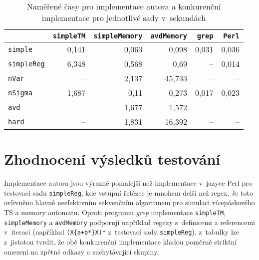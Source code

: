\documentclass[thesis=B,czech]{FITthesis}[2019/12/23]
\theoremstyle{definition}
\begin{document}
\begin{table}
\begin{center}
\begin{tabular}{l||r|r|r|r|r}
 & 		\texttt{simpleTM}		 & \texttt{simpleMemory}   & 	\texttt{avdMemory}			&   	\texttt{grep}		      & \texttt{Perl} \\ \hline \hline
 \texttt{simple} &               0,141      & 0,063  &   0,098                 &       0,031              &  0,036  \\ \hline
 \texttt{simpleReg} &           6,348      &  0,568 &  0,69                  &   --\footnote[1]              & 0,014  \\ \hline
 \texttt{nVar} &             --\footnote[7]          &   2,137    &      45,733          &                --\footnotemark[1]      &  --\footnotemark[1]\\ \hline
 \texttt{nSigma}&            1,687           & 0,11     &        0,273       &             0,017         &   0,023\\ \hline
 \texttt{avd}& --\footnotemark[7] & 1,677 & 1,572 & --\footnotemark[1] & --\footnotemark[1] \\ \hline
\texttt{hard}&             --\footnotemark[7]      & 1,831 &          16,392         &                --\footnotemark[1]     &  --\footnotemark[1] \\ \hline
\end{tabular}
\end{center}
\caption{\label{tab:time} Naměřené časy pro implementace autora a konkurenční implementace pro jednotlivé sady v~sekundách}
\end{table}

\section{Zhodnocení výsledků testování}
Implementace autora jsou výrazně pomalejší než implementace v~jazyce Perl pro testovací sadu \texttt{simpleReg}, kde vstupní řetězec je mnohem delší než regex. Je toto ovlivněno hlavně neefektivním sekvenčním algoritmem pro simulaci vícepáskového TS a memory automatu. Oproti programu \emph{grep} implementace \texttt{simpleTM}, \texttt{simpleMemory} a \texttt{avdMemory} podporují například regexy s~definicemi a referencemi v~iteraci (například \texttt{(X\{a+b*\}X)*} z~testovací sady \texttt{simpleReg}). z~tabulky lze z~jistotou tvrdit, že obě konkurenční implementace kladou poměrně striktní omezení na zpětné odkazy a zachytávající skupiny.
\end{document}
